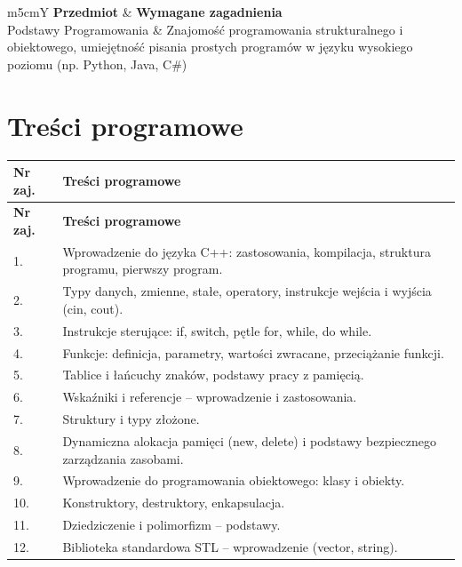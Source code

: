 \documentclass[12pt, a4paper]{article}
\newcommand{\thdrule}{\noalign{\global\setlength{\extrarowheight}{0pt}}}
\newcommand{\thdend}{\noalign{\global\setlength{\extrarowheight}{3pt}}}
\begin{document}
{\scriptsize
\begin{tabularx}{\textwidth}{m{5cm}Y}
\thdrule\toprule
{} {\color{white}\textbf{Przedmiot}} & {\color{white}\textbf{Wymagane zagadnienia}} \\
\midrule\thdend
   Podstawy Programowania & Znajomość programowania strukturalnego i obiektowego, umiejętność pisania prostych programów w języku wysokiego poziomu (np. Python, Java, C\#) \\
\bottomrule
\end{tabularx}}

\section{Treści programowe}

{\scriptsize
\begin{longtable}{m{1.5cm}m{14.5cm}}
\thdrule\toprule
\rowcolor{pjatkRed} {\color{white}\textbf{Nr zaj.}} & {\color{white}\textbf{Treści programowe}} \\
\midrule\thdend
\endfirsthead
\thdrule\toprule
\rowcolor{pjatkRed} {\color{white}\textbf{Nr zaj.}} & {\color{white}\textbf{Treści programowe}} \\
\midrule\thdend
\endhead
  \rowcolor{tableRowLight} 1. & Wprowadzenie do języka C++: zastosowania, kompilacja, struktura programu, pierwszy program. \\
  \rowcolor{tableRowAlt} 2. & Typy danych, zmienne, stałe, operatory, instrukcje wejścia i wyjścia (cin, cout). \\
  \rowcolor{tableRowLight} 3. & Instrukcje sterujące: if, switch, pętle for, while, do while. \\
  \rowcolor{tableRowAlt} 4. & Funkcje: definicja, parametry, wartości zwracane, przeciążanie funkcji. \\
  \rowcolor{tableRowLight} 5. & Tablice i łańcuchy znaków, podstawy pracy z pamięcią. \\
  \rowcolor{tableRowAlt} 6. & Wskaźniki i referencje – wprowadzenie i zastosowania. \\
  \rowcolor{tableRowLight} 7. & Struktury i typy złożone. \\
  \rowcolor{tableRowAlt} 8. & Dynamiczna alokacja pamięci (new, delete) i podstawy bezpiecznego zarządzania zasobami. \\
  \rowcolor{tableRowLight} 9. & Wprowadzenie do programowania obiektowego: klasy i obiekty. \\
  \rowcolor{tableRowAlt} 10. &  Konstruktory, destruktory, enkapsulacja. \\
  \rowcolor{tableRowLight} 11. &  Dziedziczenie i polimorfizm – podstawy. \\
  \rowcolor{tableRowAlt} 12. &  Biblioteka standardowa STL – wprowadzenie (vector, string). \\
\bottomrule
\end{longtable}}
\end{document}
